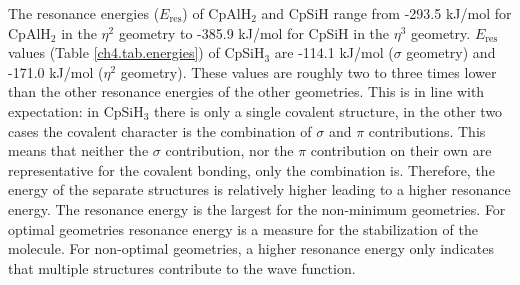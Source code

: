 The resonance energies ($E_\mathrm{res}$) of CpAlH$_2$ and CpSiH range from \mbox{-293.5} kJ/mol for CpAlH$_2$ in the $\eta^2$ geometry to \mbox{-385.9} kJ/mol for CpSiH in the $\eta^3$ geometry. $E_\mathrm{res}$ values (Table \ref{ch4.tab.energies}) of CpSiH$_3$ are \mbox{-114.1} kJ/mol ($\sigma$ geometry) and \mbox{-171.0} kJ/mol ($\eta^2$ geometry). These values are roughly two to three times lower than the other resonance energies of the other geometries. This is in line with expectation: in CpSiH$_3$ there is only a single covalent structure, in the other two cases the covalent character is the combination of $\sigma$ and $\pi$ contributions. This means that neither the $\sigma$ contribution, nor the $\pi$ contribution on their own are representative for the covalent bonding, only the combination is. Therefore, the energy of the separate structures is relatively higher leading to a higher resonance energy. The resonance energy is the largest for the non-minimum geometries. For optimal geometries resonance energy is a measure for the stabilization of the molecule. For non-optimal geometries, a higher resonance energy only indicates that multiple structures contribute to the wave function.

